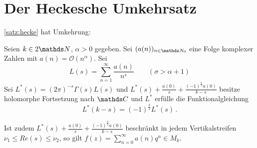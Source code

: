 \section{Der Heckesche Umkehrsatz}

\autoref{satz:hecke} hat Umkehrung:

\begin{satz}[Hecke]
	Seien $k \in 2\NN$, $\alpha > 0$ gegeben.
	Sei $(a(n))_{n\in\NN_0}$ eine Folge komplexer Zahlen mit $a(n) = \mathcal{O}(n^\alpha)$.
	Sei
	\[
		L(s) = \sum_{n=1}^\infty \frac{a(n)}{n^s}
		\qquad (\sigma > \alpha +1)
	\]
	Sei $L^*(s) = (2\pi)^{-s} \Gamma(s) L(s)$ und $L^*(s) + \frac{a(0)}{s} + \frac{(-1)^{\frac{k}{2}} a(0)}{k-s}$ besitze holomorphe Fortsetzung nach $\CC$ und $L^*$ erfülle die Funktionalgleichung
	\[
		L^*(k-s) = (-1)^{\frac{k}{2}}L^*(s)\,.
	\]
	
	Ist zudem $L^*(s) + \frac{a(0)}{s} + \frac{(-1)^{\frac{k}{2}} a(0)}{k-s}$ beschränkt in jedem Vertikalstreifen $\nu_1 \leq Re(s) \leq \nu_2$, so gilt $f(z) = \sum_{n=0}^\infty a(n)q^n \in M_k$.
\end{satz}

